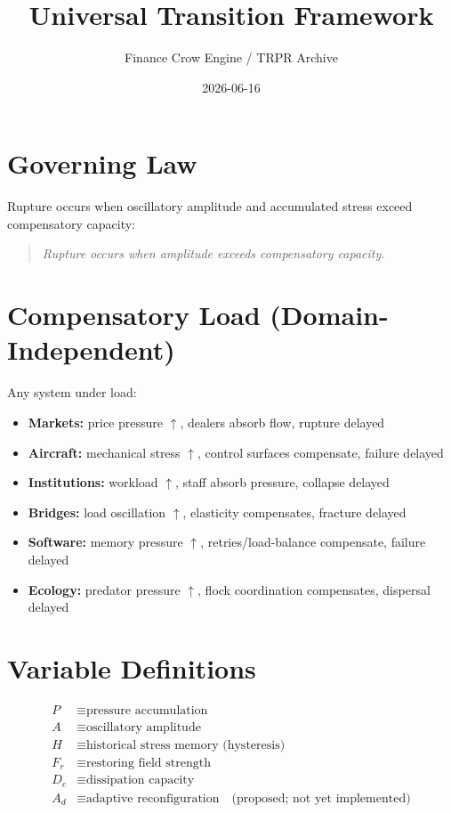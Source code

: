 \documentclass[11pt]{article}
\title{Universal Transition Framework}
\author{Finance Crow Engine / TRPR Archive}
\date{2026-06-16}
\begin{document}
\maketitle

\section{Governing Law}
Rupture occurs when oscillatory amplitude and accumulated stress exceed compensatory capacity:
\begin{quote}
\textit{Rupture occurs when amplitude exceeds compensatory capacity.}
\end{quote}

\section{Compensatory Load (Domain-Independent)}
Any system under load:
\begin{itemize}
  \item \textbf{Markets:} price pressure $\uparrow$, dealers absorb flow, rupture delayed
  \item \textbf{Aircraft:} mechanical stress $\uparrow$, control surfaces compensate, failure delayed
  \item \textbf{Institutions:} workload $\uparrow$, staff absorb pressure, collapse delayed
  \item \textbf{Bridges:} load oscillation $\uparrow$, elasticity compensates, fracture delayed
  \item \textbf{Software:} memory pressure $\uparrow$, retries/load-balance compensate, failure delayed
  \item \textbf{Ecology:} predator pressure $\uparrow$, flock coordination compensates, dispersal delayed
\end{itemize}

\section{Variable Definitions}
\begin{align}
P &\equiv \text{pressure accumulation} \\
A &\equiv \text{oscillatory amplitude} \\
H &\equiv \text{historical stress memory (hysteresis)} \\
F_r &\equiv \text{restoring field strength} \\
D_c &\equiv \text{dissipation capacity} \\
A_d &\equiv \text{adaptive reconfiguration} \quad \text{(proposed; not yet implemented)}
\end{align}
\end{document}
